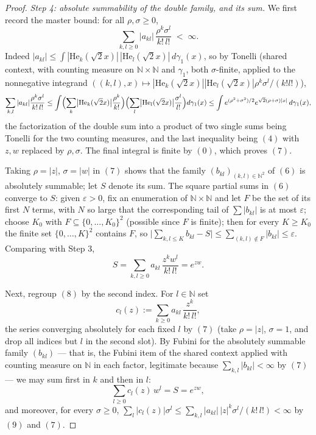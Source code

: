 \begin{proof}
\emph{Step 4: absolute summability of the double family, and its sum.}
We first record the master bound: for all $\rho, \sigma \geq 0$,
\begin{equation*}
  \sum_{k,l \geq 0} |a_{kl}|\,\frac{\rho^k \sigma^l}{k!\,l!} \;<\; \infty .
  \tag{7}
\end{equation*}
Indeed $|a_{kl}| \leq \int |\mathrm{He}_k(\sqrt2 x)|\,|\mathrm{He}_l(\sqrt2 x)|
\,d\gamma_1(x)$, so by Tonelli (shared context, with counting measure on
$\mathbb{N}\times\mathbb{N}$ and $\gamma_1$, both $\sigma$-finite, applied to the
nonnegative integrand
$((k,l),x) \mapsto |\mathrm{He}_k(\sqrt2 x)||\mathrm{He}_l(\sqrt2 x)|
\rho^k\sigma^l/(k!l!)$),
\[
  \sum_{k,l} |a_{kl}|\frac{\rho^k\sigma^l}{k!\,l!}
    \leq \int
      \Bigl(\sum_{k}\bigl|\mathrm{He}_k(\sqrt2 x)\bigr|\frac{\rho^k}{k!}\Bigr)
      \Bigl(\sum_{l}\bigl|\mathrm{He}_l(\sqrt2 x)\bigr|\frac{\sigma^l}{l!}\Bigr)
      d\gamma_1(x)
    \leq \int e^{(\rho^2+\sigma^2)/2} e^{\sqrt2(\rho+\sigma)|x|}\, d\gamma_1(x),
\]
the factorization of the double sum into a product of two single sums being
Tonelli for the two counting measures, and the last inequality being $(4)$ with
$z, w$ replaced by $\rho, \sigma$.  The final integral is finite by $(0)$, which
proves $(7)$.

Taking $\rho = |z|$, $\sigma = |w|$ in $(7)$ shows that the family
$(b_{kl})_{(k,l)\in\mathbb{N}^2}$ of $(6)$ is absolutely summable; let $S$ denote
its sum.  The square partial sums in $(6)$ converge to $S$: given $\varepsilon >
0$, fix an enumeration of $\mathbb{N}\times\mathbb{N}$ and let $F$ be the set of
its first $N$ terms, with $N$ so large that the corresponding tail of
$\sum|b_{kl}|$ is at most $\varepsilon$; choose $K_0$ with
$F \subseteq \{0,\dots,K_0\}^2$ (possible since $F$ is finite); then for every
$K \geq K_0$ the finite set $\{0,\dots,K\}^2$ contains $F$, so
$\bigl|\sum_{k,l\leq K} b_{kl} - S\bigr| \leq \sum_{(k,l)\notin F} |b_{kl}|
\leq \varepsilon$.  Comparing with Step 3,
\begin{equation*}
  S = \sum_{k,l\geq0} a_{kl}\,\frac{z^k w^l}{k!\,l!} = e^{zw} .
  \tag{8}
\end{equation*}

Next, regroup $(8)$ by the second index.  For $l \in \mathbb{N}$ set
\begin{equation*}
  c_l(z) := \sum_{k\geq0} a_{kl}\,\frac{z^k}{k!\,l!},
  \tag{9}
\end{equation*}
the series converging absolutely for each fixed $l$ by $(7)$ (take
$\rho = |z|$, $\sigma = 1$, and drop all indices but $l$ in the second slot).
By Fubini for the absolutely summable family $(b_{kl})$ --- that is, the Fubini
item of the shared context applied with counting measure on $\mathbb{N}$ in each
factor, legitimate because $\sum_{k,l}|b_{kl}| < \infty$ by $(7)$ --- we may sum
first in $k$ and then in $l$:
\begin{equation*}
  \sum_{l\geq0} c_l(z)\, w^l = S = e^{zw},
  \tag{10}
\end{equation*}
and moreover, for every $\sigma \geq 0$,
$\sum_l |c_l(z)|\sigma^l \leq \sum_{k,l}|a_{kl}|\,|z|^k\sigma^l/(k!\,l!) < \infty$
by $(9)$ and $(7)$.


\end{proof}
